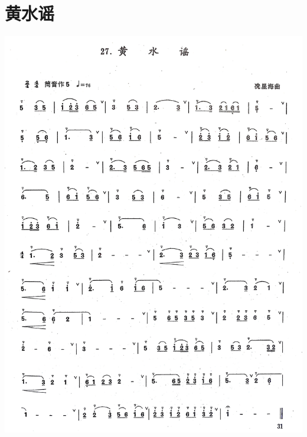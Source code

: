 \documentclass[cn,pad,chinese,chinesefont=nofont]{elegantbook}
\begin{document}
\section{黄水谣}         
	\includegraphics[width=\textwidth]{dongxiao/IMG_0940.jpg}  
\end{document}
